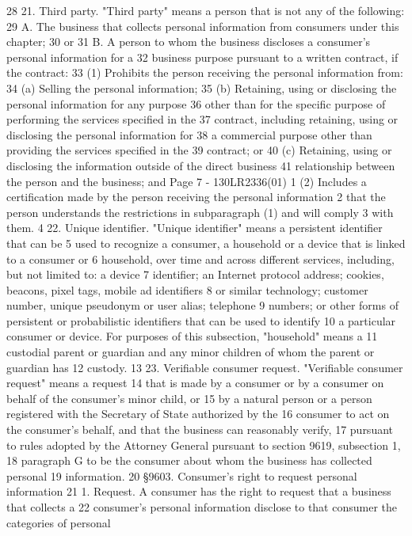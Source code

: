28 21. Third party. "Third party" means a person that is not any of the following:
29 A. The business that collects personal information from consumers under this chapter;
30 or
31 B. A person to whom the business discloses a consumer's personal information for a
32 business purpose pursuant to a written contract, if the contract:
33 (1) Prohibits the person receiving the personal information from:
34 (a) Selling the personal information;
35 (b) Retaining, using or disclosing the personal information for any purpose
36 other than for the specific purpose of performing the services specified in the
37 contract, including retaining, using or disclosing the personal information for
38 a commercial purpose other than providing the services specified in the
39 contract; or
40 (c) Retaining, using or disclosing the information outside of the direct business
41 relationship between the person and the business; and
Page 7 - 130LR2336(01)
1 (2) Includes a certification made by the person receiving the personal information
2 that the person understands the restrictions in subparagraph (1) and will comply
3 with them.
4 22. Unique identifier. "Unique identifier" means a persistent identifier that can be
5 used to recognize a consumer, a household or a device that is linked to a consumer or
6 household, over time and across different services, including, but not limited to: a device
7 identifier; an Internet protocol address; cookies, beacons, pixel tags, mobile ad identifiers
8 or similar technology; customer number, unique pseudonym or user alias; telephone
9 numbers; or other forms of persistent or probabilistic identifiers that can be used to identify
10 a particular consumer or device. For purposes of this subsection, "household" means a
11 custodial parent or guardian and any minor children of whom the parent or guardian has
12 custody.
13 23. Verifiable consumer request. "Verifiable consumer request" means a request
14 that is made by a consumer or by a consumer on behalf of the consumer's minor child, or
15 by a natural person or a person registered with the Secretary of State authorized by the
16 consumer to act on the consumer's behalf, and that the business can reasonably verify,
17 pursuant to rules adopted by the Attorney General pursuant to section 9619, subsection 1,
18 paragraph G to be the consumer about whom the business has collected personal
19 information.
20 §9603. Consumer's right to request personal information
21 1. Request. A consumer has the right to request that a business that collects a
22 consumer's personal information disclose to that consumer the categories of personal
